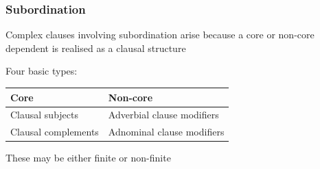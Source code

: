 \documentclass[10pt, compress, aspectratio=169]{beamer}
\begin{document}
\begin{frame}
  \frametitle{Subordination}

Complex clauses involving subordination arise because a core or non-core dependent is realised as a clausal structure

Four basic types:
\begin{center}
\begin{tabular}{ll}
  \toprule
  \textbf{Core} & \textbf{Non-core} \\
  \hline
  Clausal subjects & Adverbial clause modifiers \\
  Clausal complements & Adnominal clause modifiers \\
  \bottomrule
\end{tabular}
\end{center}

These may be either finite or non-finite


\end{frame}
\end{document}
